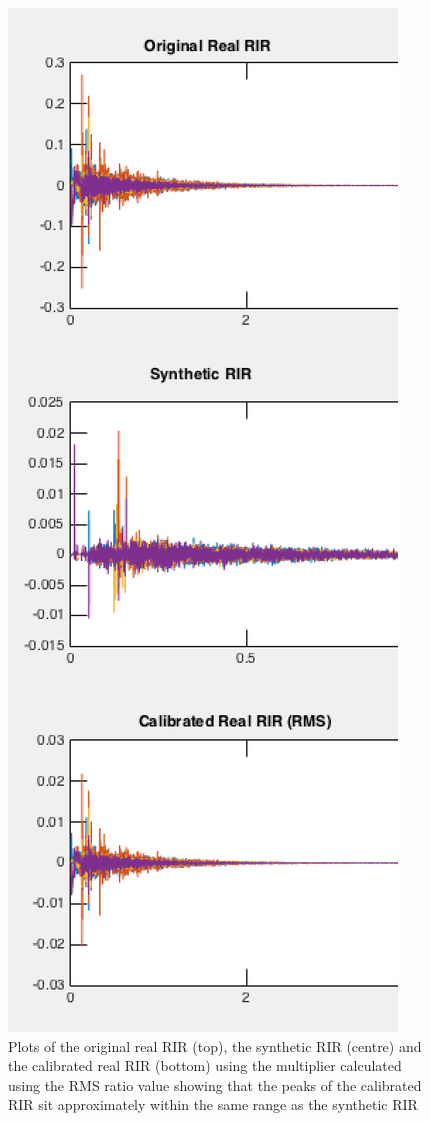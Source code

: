 \documentclass[../../main.tex]{subfiles}
\begin{document}
		\begin{figure}[H]
			\begin{center}
				\includegraphics[scale = 0.3]{Sections/Implementation/RealRIRs/images/calibration/CalRMS_RIR_edit2.png} 
				\caption{Plots of the original real \ac{RIR} (top), the synthetic \ac{RIR} (centre) and the calibrated real \ac{RIR} (bottom) using the multiplier calculated using the RMS ratio value showing that the peaks of the calibrated \ac{RIR} sit approximately within the same range as the synthetic \ac{RIR}}
				\label{calRMS}
			\end{center}
		\end{figure}
\end{document}
